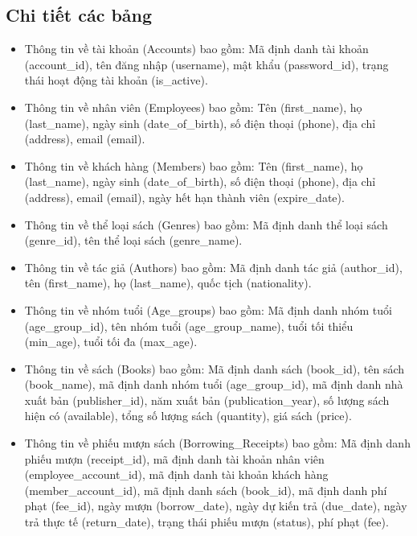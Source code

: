 \documentclass[12pt]{article}
\begin{document}
\subsection{Chi tiết các bảng}
\begin{itemize}[leftmargin=1.5cm]
    \item Thông tin về tài khoản (Accounts) bao gồm: Mã định danh tài khoản (account\_id), tên đăng nhập (username), mật khẩu (password\_id), trạng thái hoạt động tài khoản (is\_active).
    \item Thông tin về nhân viên (Employees) bao gồm: Tên (first\_name), họ (last\_name), ngày sinh (date\_of\_birth), số điện thoại (phone), địa chỉ (address), email (email).
    \item Thông tin về khách hàng (Members) bao gồm: Tên (first\_name), họ (last\_name), ngày sinh (date\_of\_birth), số điện thoại (phone), địa chỉ (address), email (email), ngày hết hạn thành viên (expire\_date).
    \item Thông tin về thể loại sách (Genres) bao gồm: Mã định danh thể loại sách (genre\_id), tên thể loại sách (genre\_name).
    \item Thông tin về tác giả (Authors) bao gồm: Mã định danh tác giả (author\_id), tên (first\_name), họ (last\_name), quốc tịch (nationality).
    \item Thông tin về nhóm tuổi (Age\_groups) bao gồm: Mã định danh nhóm tuổi (age\_group\_id), tên nhóm tuổi (age\_group\_name), tuổi tối thiểu (min\_age), tuổi tối đa (max\_age).
    \item Thông tin về sách (Books) bao gồm: Mã định danh sách (book\_id), tên sách (book\_name), mã định danh nhóm tuổi (age\_group\_id), mã định danh nhà xuất bản (publisher\_id), năm xuất bản (publication\_year), số lượng sách hiện có (available), tổng số lượng sách (quantity), giá sách (price).
    \item Thông tin về phiếu mượn sách (Borrowing\_Receipts) bao gồm: Mã định danh phiếu mượn (receipt\_id), mã định danh tài khoản nhân viên (employee\_account\_id), mã định danh tài khoản khách hàng (member\_account\_id), mã định danh sách (book\_id), mã định danh phí phạt (fee\_id), ngày mượn (borrow\_date), ngày dự kiến trả (due\_date), ngày trả thực tế (return\_date), trạng thái phiếu mượn (status), phí phạt (fee).
\end{itemize}
\end{document}
